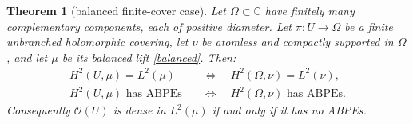 \documentclass[11pt]{article}
\newtheorem{theorem}{Theorem}
\newcommand{\OO}{\mathcal O}
\newcommand{\C}{\mathbb C}
\begin{document}
\begin{theorem}[balanced finite-cover case]\label{thm:main}
Let $\Omega\subset\C$ have finitely many complementary components, each of
positive diameter. Let $\pi:U\to\Omega$ be a finite unbranched holomorphic
covering, let $\nu$ be atomless and compactly supported in $\Omega$, and let
$\mu$ be its balanced lift \eqref{balanced}. Then:
\begin{align*}
 H^2(U,\mu)=L^2(\mu)
 &\quad\Longleftrightarrow\quad
 H^2(\Omega,\nu)=L^2(\nu),\\
 H^2(U,\mu)\text{ has ABPEs}
 &\quad\Longleftrightarrow\quad
 H^2(\Omega,\nu)\text{ has ABPEs}.
\end{align*}
Consequently $\OO(U)$ is dense in $L^2(\mu)$ if and only if it has no ABPEs.
\end{theorem}
\end{document}

